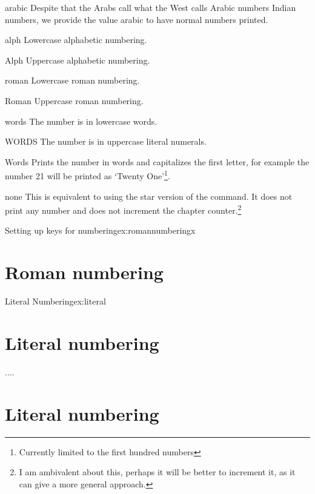 \begin{marglist}
\item [arabic] Despite that the Arabs call what the West calls Arabic numbers Indian numbers, we provide the value arabic to have normal numbers printed.
\item [alph] Lowercase alphabetic numbering.
\item [Alph] Uppercase alphabetic numbering.
\item [roman] Lowercase roman numbering.
\item [Roman] Uppercase roman numbering.
\item [words] The number is in lowercase words.
\item [WORDS] The number is in uppercase literal numerals.
\item [Words] Prints the number in words and capitalizes the first letter, for example the number 21 will be printed as `Twenty One'\footnote{Currently limited to the first hundred numbers}.
\item [none] This is equivalent to using the star version of the command. It does not print any number and does not increment the chapter counter.\footnote{I am ambivalent about this, perhaps it will be better to increment it, as it can give a more general approach.}
\end{marglist}


\begin{texexample}{Setting up keys for numbering}{ex:romannumberingx}
\bgroup
{}
\chapter{Roman numbering}
\egroup
\end{texexample}



\begin{texexample}{Literal Numbering}{ex:literal}
\chapter{Literal numbering}
....


\chapter{Literal numbering}
\end{texexample}


